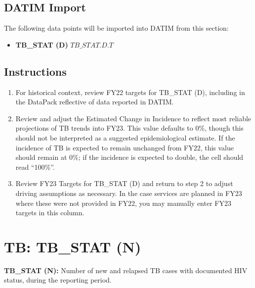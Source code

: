 \documentclass[
  openany]{book}
\providecommand{\tightlist}{%
  \setlength{\itemsep}{0pt}\setlength{\parskip}{0pt}}
\begin{document}
\hypertarget{datim-import-24}{%
\subsection{DATIM Import}\label{datim-import-24}}

The following data points will be imported into DATIM from this section:

\begin{itemize}
\tightlist
\item
  \textbf{TB\_STAT (D)} \(TB\_STAT.D.T\)
\end{itemize}

\hypertarget{instructions-24}{%
\subsection{Instructions}\label{instructions-24}}

\begin{enumerate}
\def\labelenumi{\arabic{enumi}.}
\item
  For historical context, review FY22 targets for TB\_STAT (D),
  including in the DataPack reflective of data reported in DATIM.
\item
  Review and adjust the Estimated Change in Incidence to reflect most
  reliable projections of TB trends into FY23. This value defaults to
  0\%, though this should not be interpreted as a suggested
  epidemiological estimate. If the incidence of TB is expected to
  remain unchanged from FY22, this value should remain at 0\%; if the
  incidence is expected to double, the cell should read ``100\%''.
\item
  Review FY23 Targets for TB\_STAT (D) and return to step 2 to adjust
  driving assumptions as necessary. In the case services are planned
  in FY23 where these were not provided in FY22, you may manually
  enter FY23 targets in this column.
\end{enumerate}

\hypertarget{tb-tb_stat-n}{%
\section{TB: TB\_STAT (N)}\label{tb-tb_stat-n}}

\textbf{TB\_STAT (N):} Number of new and relapsed TB cases with documented HIV
status, during the reporting period.
\end{document}

